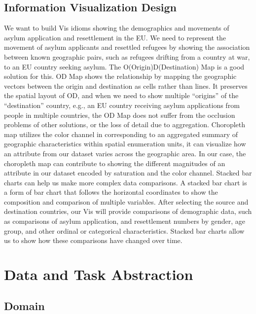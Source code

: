 \documentclass[journal]{vgtc}                %
\begin{document}
\subsection{Information Visualization Design}
We want to build Vis idioms showing the demographics and movements of asylum application and resettlement in the EU. We need to represent the movement of asylum applicants and resettled refugees by showing the association between known geographic pairs, such as refugees drifting from a country at war, to an EU country seeking asylum. The O(Origin)D(Destination) Map is a good solution for this. OD Map shows the relationship by mapping the geographic vectors between the origin and destination as cells rather than lines. It preserves the spatial layout of OD, and when we need to show multiple “origins” of the “destination” country, e.g., an EU country receiving asylum applications from people in multiple countries, the OD Map does not suffer from the occlusion problems of other solutions, or the loss of detail due to aggregation\cite{slingsby:2010}. Choropleth map utilizes the color channel in corresponding to an aggregated summary of geographic characteristics within spatial enumeration units\cite{dent:1990}, it can visualize how an attribute from our dataset varies across the geographic area. In our case, the choropleth map can contribute to showing the different magnitudes of an attribute in our dataset encoded by saturation and the color channel. Stacked bar charts can help us make more complex data comparisons. A stacked bar chart is a form of bar chart that follows the horizontal coordinates to show the composition and comparison of multiple variables. After selecting the source and destination countries, our Vis will provide comparisons of demographic data, such as comparisons of asylum application, and resettlement numbers by gender, age group, and other ordinal or categorical characteristics. Stacked bar charts allow us to show how these comparisons have changed over time\cite{donnelly_kelley:2013}.

\section{Data and Task Abstraction}

\subsection{Domain}
\end{document}
